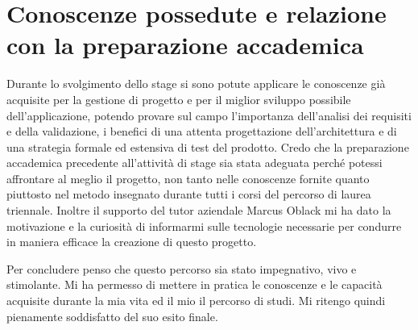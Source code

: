 



\section{Conoscenze possedute e relazione con la preparazione accademica}

Durante lo svolgimento dello stage si sono potute applicare le conoscenze già
acquisite per la gestione di progetto e per il miglior sviluppo possibile dell'applicazione,
potendo provare sul campo l'importanza dell'analisi dei requisiti e della
validazione, i benefici di una attenta progettazione dell'architettura e
di una strategia formale ed estensiva di test del prodotto.
Credo che la preparazione accademica precedente all'attività di stage
sia stata adeguata perché potessi affrontare al meglio il progetto, non tanto
nelle conoscenze fornite quanto piuttosto nel metodo insegnato durante tutti i
corsi del percorso di laurea triennale. Inoltre il supporto del tutor aziendale Marcus Oblack mi ha dato la motivazione e la curiosità di informarmi sulle tecnologie necessarie per condurre in maniera efficace la creazione di questo progetto.

Per concludere penso che questo percorso sia stato impegnativo, vivo e stimolante. Mi ha
permesso di mettere in pratica le conoscenze e le capacità acquisite durante la mia vita ed il mio il percorso di studi. Mi ritengo quindi pienamente soddisfatto del suo esito finale.

